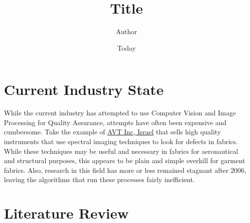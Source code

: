 \documentclass[]{article}
\begin{document}
\title{Title}
\author{Author}
\date{Today}
\maketitle

\section{Current Industry State}

While the current industry has attempted to use Computer Vision and Image Processing for Quality Assurance, attempts have often been expensive and cumbersome. Take the example of  \href{http://www.avt-inc.com/?catid=\%7B757EF709-E4DF-4C16-A2E7-5F7866D891AC\%7D}{AVT Inc, Israel} that sells high quality instruments that use spectral imaging techniques to look for defects in fabrics. While these techniques may be useful and necessary in fabrics for aeronautical and structural purposes, this appears to be plain and simple overkill for garment fabrics. Also, research in this field has more or less remained stagnant after 2006, leaving the algorithms that run these processes fairly inefficient.

\section{Literature Review}
\end{document}
